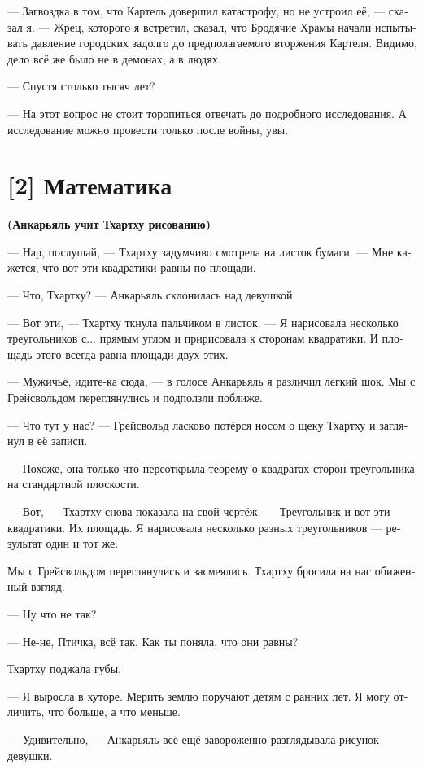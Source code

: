 \documentclass[a4paper,12pt,fleqn]{book}\usepackage{cooltooltips}\usepackage{polyglossia}\setdefaultlanguage[babelshorthands=true]{russian}\setotherlanguage{english}\defaultfontfeatures{Ligatures=TeX,Mapping=tex-text} \usepackage{xcolor}\definecolor{lightgray}{HTML}{bbbbbb}\color{lightgray}\newcommand{\ml}[3]{\textenglish{\textcolor{black}{#3}}}
\begin{document}
{--- Загвоздка в том, что Картель довершил катастрофу, но не устроил её, --- сказал я.
--- Жрец, которого я встретил, сказал, что Бродячие Храмы начали испытывать давление городских задолго до предполагаемого вторжения Картеля.
Видимо, дело всё же было не в демонах, а в людях.

--- Спустя столько тысяч лет?

--- На этот вопрос не стоит торопиться отвечать до подробного исследования.
А исследование можно провести только после войны, увы.

\section{[2] Математика}

\textbf{(Анкарьяль учит Тхартху рисованию)}

--- Нар, послушай, --- Тхартху задумчиво смотрела на листок бумаги.
--- Мне кажется, что вот эти квадратики равны по площади.

--- Что, Тхартху? --- Анкарьяль склонилась над девушкой.

--- Вот эти, --- Тхартху ткнула пальчиком в листок.
--- Я нарисовала несколько треугольников с... прямым углом и пририсовала к сторонам квадратики.
И площадь этого всегда равна площади двух этих.

--- Мужичьё, идите-ка сюда, --- в голосе Анкарьяль я различил лёгкий шок.
Мы с Грейсвольдом переглянулись и подползли поближе.

--- Что тут у нас? --- Грейсвольд ласково потёрся носом о щеку Тхартху и заглянул в её записи.

--- Похоже, она только что переоткрыла теорему о квадратах сторон треугольника на стандартной плоскости.

--- Вот, --- Тхартху снова показала на свой чертёж.
--- Треугольник и вот эти квадратики.
Их площадь.
Я нарисовала несколько разных треугольников --- результат один и тот же.

Мы с Грейсвольдом переглянулись и засмеялись.
Тхартху бросила на нас обиженный взгляд.

--- Ну что не так?

--- Не-не, Птичка, всё так.
Как ты поняла, что они равны?

Тхартху поджала губы.

--- Я выросла в хуторе.
Мерить землю поручают детям с ранних лет.
Я могу отличить, что больше, а что меньше.

--- Удивительно, --- Анкарьяль всё ещё завороженно разглядывала рисунок девушки.

}
\end{document}
